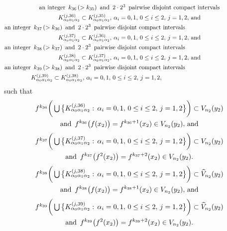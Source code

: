 \documentclass[12pt]{article}
\newcommand{\al}{\alpha}
\begin{document}
\begin{multline*}
$$
\text{an integer} \,\,\, k_{36} \, (> k_{35}) \,\,\, \text{and} \,\,\, 2 \cdot 2^3 \,\,\, \text{pairwise disjoint compact intervals} \\      K_{\al_0\al_1\al_2}^{(j,36)} \subset K_{\al_0\al_1\al_2}^{(j,35)}, \, \al_i = 0, 1, \, 0 \le i \le 2, \, j = 1, 2, \, \text{and} \\
\text{an integer} \,\,\, k_{37} \, (> k_{36}) \,\,\, \text{and} \,\,\, 2 \cdot 2^3 \,\,\, \text{pairwise disjoint compact intervals}\qquad\qquad\qquad\qquad\qquad\quad\,\,\, \\ 
K_{\al_0\al_1\al_2}^{(j,37)} \subset K_{\al_0\al_1\al_2}^{(j,36)}, \, \al_i = 0, 1, \, 0 \le i \le 2, \, j = 1, 2, \, \text{and}  \\
\text{an integer} \,\,\, k_{38} \, (> k_{37}) \,\,\, \text{and} \,\,\, 2 \cdot 2^3 \,\,\, \text{pairwise disjoint compact intervals}\qquad\qquad\qquad\qquad\qquad\quad\,\,\, \\      
K_{\al_0\al_1\al_2}^{(j,38)} \subset K_{\al_0\al_1\al_2}^{(j,37)}, \, \al_i = 0, 1, \, 0 \le i \le 2, \, j = 1, 2, \, \text{and} \\
\text{an integer} \,\,\, k_{39} \, (> k_{38}) \,\,\, \text{and} \,\,\, 2 \cdot 2^3 \,\,\, \text{pairwise disjoint compact intervals}\qquad\qquad\qquad\qquad\qquad\quad\,\,\, \\ 
K_{\al_0\al_1\al_2}^{(j,39)} \subset K_{\al_0\al_1\al_2}^{(j,38)}, \, \al_i = 0, 1, \, 0 \le i \le 2, \, j = 1, 2,  \qquad\qquad\qquad\qquad\qquad\quad
$$
\end{multline*}
such that
\begin{multline*}
$$
f^{k_{36}}\bigg(\bigcup \big\{ K_{\al_0\al_1\al_2}^{(j,36)}: \, \al_i = 0, 1, \, 0 \le i \le 2, \, j = 1, 2 \big\}\bigg) \subset V_{n_2}(y_2) \\ \text{and} \,\,\, f^{k_{36}}\big(f(x_2)\big) = f^{k_{36}+1}(x_2) \in V_{n_2}(y_2), \, \text{and}
$$
\end{multline*}
\begin{multline*}
$$
f^{k_{37}}\bigg(\bigcup \big\{ K_{\al_0\al_1\al_2}^{(j,37)}: \, \al_i = 0, 1, \, 0 \le i \le 2, \, j = 1, 2 \big\}\bigg) \subset V_{n_2}(y_2) \\ \text{and} \,\,\, f^{k_{37}}\big(f^2(x_2)\big) = f^{k_{37}+2}(x_2) \in V_{n_2}(y_2).
$$
\end{multline*}
\begin{multline*}
$$
f^{k_{38}}\bigg(\bigcup \big\{ K_{\al_0\al_1\al_2}^{(j,38)}: \, \al_i = 0, 1, \, 0 \le i \le 2, \, j = 1, 2 \big\}\bigg) \subset \widehat  V_{n_2}(y_2) \\ \text{and} \,\,\, f^{k_{38}}\big(f(x_2)\big) = f^{k_{38}+1}(x_2) \in V_{n_2}(y_2), \, \text{and}
$$
\end{multline*}
\begin{multline*}
$$
f^{k_{39}}\bigg(\bigcup \big\{ K_{\al_0\al_1\al_2}^{(j,39)}: \, \al_i = 0, 1, \, 0 \le i \le 2, \, j = 1, 2 \big\}\bigg) \subset \widehat  V_{n_2}(y_2) \\ \text{and} \,\,\, f^{k_{39}}\big(f^2(x_2)\big) = f^{k_{39}+2}(x_2) \in V_{n_2}(y_2).
$$
\end{multline*}
\end{document}
